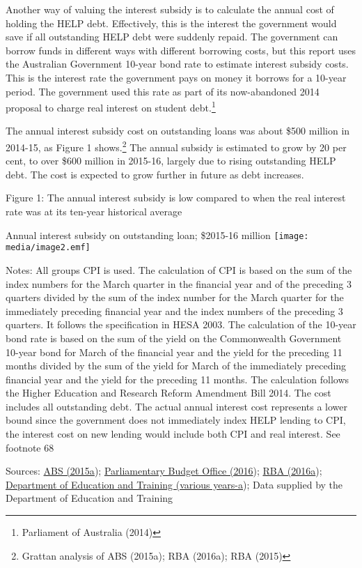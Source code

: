 \documentclass[]{book}
\begin{document}
Another way of valuing the interest subsidy is to calculate the annual cost of holding the HELP debt. Effectively, this is the interest the government would save if all outstanding HELP debt were suddenly repaid. The government can borrow funds in different ways with different borrowing costs, but this report uses the Australian Government 10-year bond rate to estimate interest subsidy costs. This is the interest rate the government pays on money it borrows for a 10-year period. The government used this rate as part of its now-abandoned 2014 proposal to charge real interest on student debt.\footnote{Parliament of Australia (2014)}

The annual interest subsidy cost on outstanding loans was about \$500 million in 2014-15, as Figure 1 shows.\footnote{Grattan analysis of ABS (2015a); RBA (2016a); RBA (2015)} The annual subsidy is estimated to grow by 20 per cent, to over \$600 million in 2015-16, largely due to rising outstanding HELP debt. The cost is expected to grow further in future as debt increases.

\protect\hypertarget{_Ref332980903}{}{}Figure 1: The annual interest subsidy is low compared to when the real interest rate was at its ten-year historical average

Annual interest subsidy on outstanding loan; \$2015-16 million \texttt{[image: media/image2.emf]}

Notes: All groups CPI is used. The calculation of CPI is based on the sum of the index numbers for the March quarter in the financial year and of the preceding 3 quarters divided by the sum of the index number for the March quarter for the immediately preceding financial year and the index numbers of the preceding 3 quarters. It follows the specification in HESA 2003. The calculation of the 10-year bond rate is based on the sum of the yield on the Commonwealth Government 10-year bond for March of the financial year and the yield for the preceding 11 months divided by the sum of the yield for March of the immediately preceding financial year and the yield for the preceding 11 months. The calculation follows the Higher Education and Research Reform Amendment Bill 2014. The cost includes all outstanding debt. The actual annual interest cost represents a lower bound since the government does not immediately index HELP lending to CPI, the interest cost on new lending would include both CPI and real interest. See footnote 68

Sources: \protect\hyperlink{_ENREF_2}{ABS (2015a}); \protect\hyperlink{_ENREF_65}{Parliamentary Budget Office (2016}); \protect\hyperlink{_ENREF_68}{RBA (2016a}); \protect\hyperlink{_ENREF_35}{Department of Education and Training (various years-a}); Data supplied by the Department of Education and Training
\end{document}

